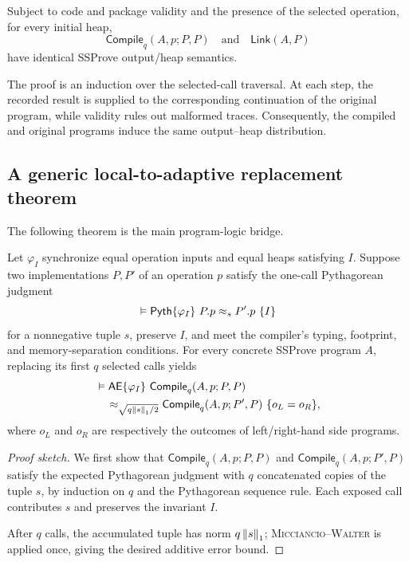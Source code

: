 \begin{theorem}
\label{thm:compile-same}
Subject to code and package validity and the presence of the selected
operation, for every initial heap,
\[
 \mathsf{Compile}_q(A,p;P,P)
 \quad\text{and}\quad
 \mathsf{Link}(A,P)
\]
have identical SSProve output/heap semantics.
\end{theorem}

The proof is an induction over the selected-call traversal.  At each step, the
recorded result is supplied to the corresponding continuation of the original
program, while validity rules out malformed traces.  Consequently, the
compiled and original programs induce the same output--heap distribution.

\subsection{A generic local-to-adaptive replacement theorem}

The following theorem is the main program-logic bridge.

\begin{theorem}
\label{thm:compile-replace}
Let \(\varphi_I\) synchronize equal operation inputs and equal heaps satisfying
\(I\).  Suppose two implementations \(P,P'\) of an operation \(p\) satisfy
the one-call Pythagorean judgment
\[
 \vDash\Pyth\{\varphi_I\}\ P.p\approx_s P'.p\ \{I\}
\]
for a nonnegative tuple \(s\), preserve \(I\), and meet the compiler's typing,
footprint, and memory-separation conditions.
For every concrete SSProve program \(A\), replacing its first
\(q\) selected calls yields
\[
\begin{aligned}
 &\vDash\mathsf{AE}\{\varphi_I\}\ \mathsf{Compile}_q(A,p;P,P)\\
 &\quad\approx_{\sqrt{q\left\lVert s\right\rVert_1/2}}
   \mathsf{Compile}_q(A,p;P',P)\ \{o_L=o_R\},
\end{aligned}
\]
where $o_L$ and $o_R$ are respectively the outcomes of left/right-hand side programs.
\end{theorem}
\begin{proof}[Proof sketch]
We first show that \(\mathsf{Compile}_q(A,p;P,P)\) and
\(\mathsf{Compile}_q(A,p;P',P)\) satisfy the expected Pythagorean judgment with
\(q\) concatenated copies of the tuple \(s\), by induction on \(q\) and the
Pythagorean sequence rule.
Each exposed call contributes \(s\) and preserves the invariant \(I\).

After \(q\) calls, the accumulated tuple has norm
\(q\left\lVert s\right\rVert_1\); \textsc{Micciancio--Walter} is applied once, giving the
desired additive error bound.
\end{proof}

